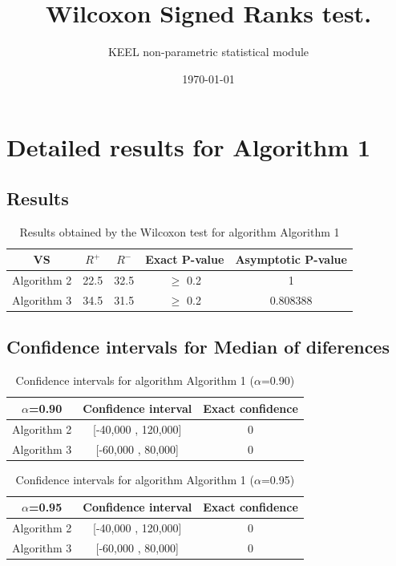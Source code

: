 \documentclass[a4paper,10pt]{article}
\title{Wilcoxon Signed Ranks test.}
\date{\today}
\author{KEEL non-parametric statistical module}
\begin{document}
\pagestyle{empty}
\maketitle
\thispagestyle{empty}



\section{Detailed results for Algorithm 1}


\subsection{Results}

\begin{table}[!htp]
\centering\small
\begin{tabular}{
|c|c|c|c|c|}
\hline
 VS & $R^{+}$ & $R^{-}$ & Exact P-value & Asymptotic P-value \\ \hline 
Algorithm 2 & 22.5 & 32.5 & $\geq$ 0.2 & 1\\ \hline 
Algorithm 3 & 34.5 & 31.5 & $\geq$ 0.2 & 0.808388\\ \hline 

\end{tabular}
\caption{Results obtained by the Wilcoxon test for algorithm Algorithm 1}
\end{table}

\subsection{Confidence intervals for Median of diferences}

\begin{table}[!htp]
\centering\small
\begin{tabular}{
|c|c|c|}
\hline
 $\alpha$=0.90 & Confidence interval & Exact confidence \\ \hline 
Algorithm 2 & [-40,000 , 120,000] & 0\\ \hline 
Algorithm 3 & [-60,000 , 80,000] & 0\\ \hline 

\end{tabular}
\caption{Confidence intervals for algorithm Algorithm 1 ($\alpha$=0.90)}
\end{table}
\begin{table}[!htp]
\centering\small
\begin{tabular}{
|c|c|c|}
\hline
 $\alpha$=0.95 & Confidence interval & Exact confidence \\ \hline 
Algorithm 2 & [-40,000 , 120,000] & 0\\ \hline 
Algorithm 3 & [-60,000 , 80,000] & 0\\ \hline 

\end{tabular}
\caption{Confidence intervals for algorithm Algorithm 1 ($\alpha$=0.95)}
\end{table}
\end{document}
